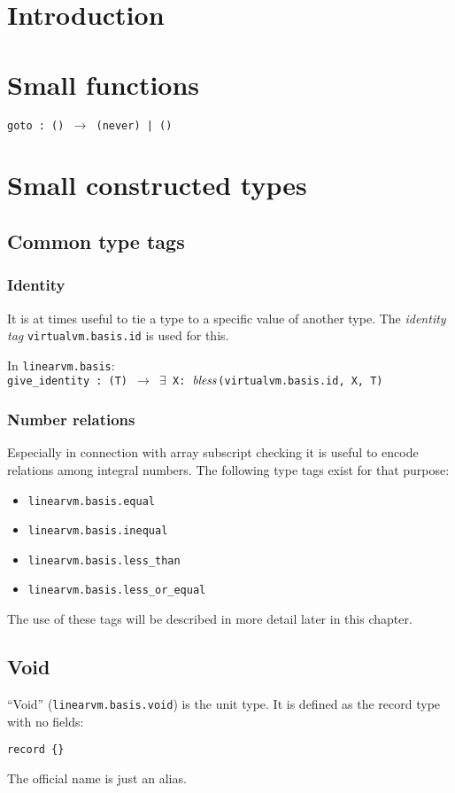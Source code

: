 \documentclass[a4paper]{book}
\newcommand\tyBless{{\ensuremath{\textnormal{\textit{bless}}}}}
\begin{document}
\chapter{Introduction}
\chapter{Small functions}

\texttt{goto : () $\to$ (never) | ()}

\chapter{Small constructed types}

\section{Common type tags}

\subsection*{Identity}
It is at times useful to tie a type to a specific value of another type.
The \emph{identity tag} \texttt{virtualvm.basis.id} is used for this.

In \texttt{linearvm.basis}:\\
\texttt{give\_identity : (T) $\to$ $\exists$ X: \tyBless(virtualvm.basis.id, X, T)}

\subsection*{Number relations}
Especially in connection with array subscript checking it is useful to encode
relations among integral numbers.
The following type tags exist for that purpose:

\begin{itemize}
\item \texttt{linearvm.basis.equal}
\item \texttt{linearvm.basis.inequal}
\item \texttt{linearvm.basis.less\_than}
\item \texttt{linearvm.basis.less\_or\_equal}
\end{itemize}

The use of these tags will be described in more detail later in this chapter.

\section{Void}
``Void'' (\texttt{linearvm.basis.void}) is the unit type.
It is defined as the record type with no fields:
\begin{center}
  \verb|record {}|
\end{center}
The official name is just an alias.
\end{document}
